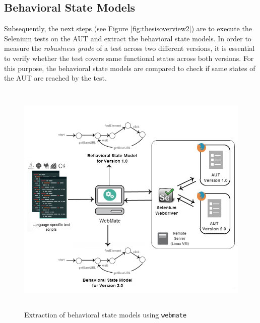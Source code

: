 \subsection{Behavioral State Models}
\label{stateModelExtraction}
Subsequently, the next steps (see Figure \ref{fig:thesisoverview2}) are to execute the Selenium tests on the AUT and extract the behavioral state models. In order to measure the \textit{robustness grade} of a test across two different versions, it is essential to verify whether the test covers same functional states across both versions. For this purpose, the behavioral state models are compared to check if same states of the AUT are reached by the test. 

\begin{figure}[h]
\makeatletter 
\makeatother
    \centering
  \includegraphics[width=5.5in,height=4.5in]{./Figures/WebMate_state_extraction.png}

\caption{Extraction of behavioral state models using \texttt{webmate}}
 \label{fig:webmateExtraction} 
\end{figure}

